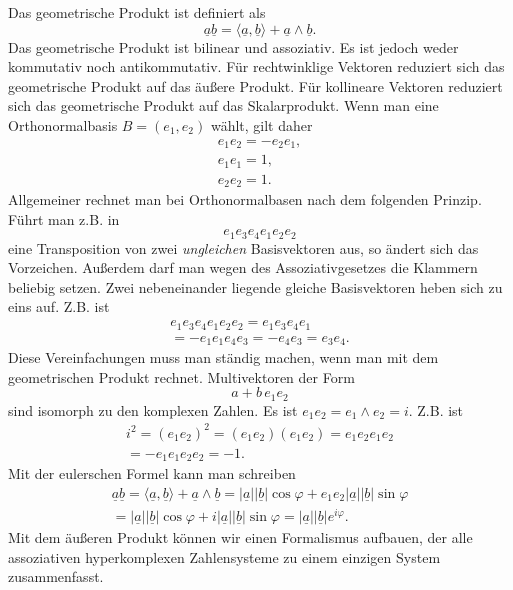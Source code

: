 \documentclass[a4paper,10pt,fleqn,twocolumn,twoside]{article}
\begin{document}
Das geometrische Produkt ist definiert als
\[\underline a\underline b =
\langle\underline a,\underline b\rangle
+\underline a\wedge\underline b.\]
\noindent
Das geometrische Produkt ist bilinear und assoziativ. Es ist jedoch
weder kommutativ noch antikommutativ.
Für rechtwinklige Vektoren reduziert sich das geometrische Produkt
auf das äußere Produkt. Für kollineare Vektoren reduziert sich das
geometrische Produkt auf das Skalarprodukt.
Wenn man eine Orthonormalbasis \(B=(e_1,e_2)\) wählt, gilt daher
\begin{gather*}
e_1e_2 = -e_2e_1,\\
e_1e_1=1,\\
e_2e_2=1.
\end{gather*}
\noindent
Allgemeiner rechnet man bei Orthonormalbasen nach dem folgenden
Prinzip. Führt man z.B. in
\[e_1e_3e_4e_1e_2e_2\]
eine Transposition von zwei \textit{ungleichen} Basisvektoren aus,
so ändert sich das Vorzeichen. Außerdem darf
man wegen des Assoziativgesetzes die Klammern beliebig setzen.
Zwei nebeneinander liegende gleiche Basisvektoren heben sich zu
eins auf. Z.B. ist
\begin{gather*}
e_1e_3e_4e_1e_2e_2 = e_1e_3e_4e_1\\
= -e_1e_1e_4e_3 = -e_4e_3 = e_3e_4.
\end{gather*}
Diese Vereinfachungen muss man ständig machen, wenn man mit dem
geometrischen Produkt rechnet. Multivektoren der Form
\[a+b\,e_1e_2\]
sind isomorph zu den komplexen Zahlen.
Es ist \(e_1e_2 = e_1\wedge e_2 = i\). Z.B. ist
\begin{gather*}
i^2 = (e_1e_2)^2 = (e_1e_2)(e_1e_2) = e_1e_2e_1e_2\\
= -e_1e_1e_2e_2 = -1.
\end{gather*}
\noindent
Mit der eulerschen Formel kann man schreiben
\begin{gather*}
\underline a\underline b =
\langle\underline a,\underline b\rangle
+\underline a\wedge\underline b
= |\underline a||\underline b|\cos\varphi
+ e_1e_2|\underline a||\underline b|\sin\varphi\\
= |\underline a||\underline b|\cos\varphi
+ i|\underline a||\underline b|\sin\varphi
= |\underline a||\underline b|e^{i\varphi}.
\end{gather*}
\noindent
Mit dem äußeren Produkt können wir einen Formalismus aufbauen,
der alle assoziativen hyperkomplexen Zahlensysteme zu einem
einzigen System zusammenfasst.
\end{document}

